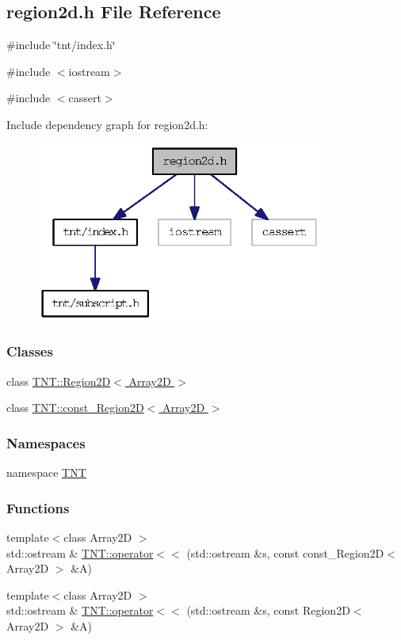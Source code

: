 \subsection{region2d.h File Reference}
\label{region2d_8h}
{\ttfamily \#include \char`\"{}tnt/index.h\char`\"{}}\par
{\ttfamily \#include $<$iostream$>$}\par
{\ttfamily \#include $<$cassert$>$}\par
Include dependency graph for region2d.h:
\nopagebreak
\begin{figure}[H]
\begin{center}
\leavevmode
\includegraphics[width=267pt]{region2d_8h__incl}
\end{center}
\end{figure}
\subsubsection*{Classes}
\begin{DoxyCompactItemize}
\item 
class \hyperlink{class_t_n_t_1_1_region2_d}{TNT::Region2D$<$ Array2D $>$}
\item 
class \hyperlink{class_t_n_t_1_1const___region2_d}{TNT::const\_\-Region2D$<$ Array2D $>$}
\end{DoxyCompactItemize}
\subsubsection*{Namespaces}
\begin{DoxyCompactItemize}
\item 
namespace \hyperlink{namespace_t_n_t}{TNT}
\end{DoxyCompactItemize}
\subsubsection*{Functions}
\begin{DoxyCompactItemize}
\item 
{\footnotesize template$<$class Array2D $>$ }\\std::ostream \& \hyperlink{namespace_t_n_t_a4f9e4a9799d18b07882e274dab0acd47}{TNT::operator$<$$<$} (std::ostream \&s, const const\_\-Region2D$<$ Array2D $>$ \&A)
\item 
{\footnotesize template$<$class Array2D $>$ }\\std::ostream \& \hyperlink{namespace_t_n_t_a83a5889e28705935e52367d1951ea254}{TNT::operator$<$$<$} (std::ostream \&s, const Region2D$<$ Array2D $>$ \&A)
\end{DoxyCompactItemize}
